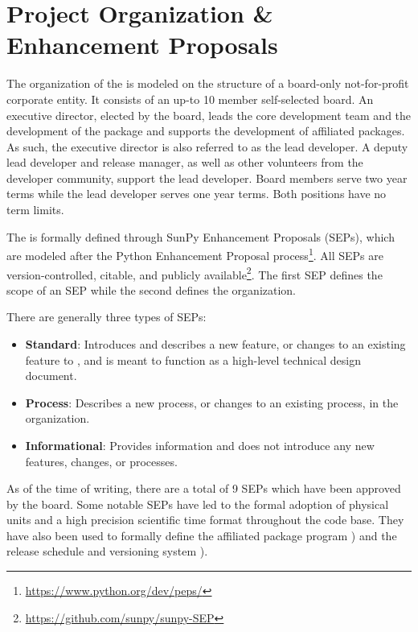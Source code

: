 \section{Project Organization \& Enhancement Proposals}
\label{sec:proj_org}

The organization of the \sunpyproj is modeled on the structure of a board-only not-for-profit corporate entity.
It consists of an up-to 10 member self-selected board.
An executive director, elected by the board, leads the core development team and the development of the \sunpypkg  package and supports the development of affiliated packages.
As such, the executive director is also referred to as the lead developer.
A deputy lead developer and release manager, as well as other volunteers from the developer community, support the lead developer.
Board members serve two year terms while the lead developer serves one year terms. Both positions have no term limits.

The \sunpyproj is formally defined through SunPy Enhancement Proposals (SEPs), which are modeled after the Python Enhancement Proposal process\footnote{\url{https://www.python.org/dev/peps/}}.
All SEPs are version-controlled, citable, and publicly available\footnote{\url{https://github.com/sunpy/sunpy-SEP}}.
The first SEP \citep[SEP-0001][]{sep-0001} defines the scope of an SEP \citep[similar to][]{ape-0001} while the second \citep[SEP-0002][]{sep-0002} defines the  \sunpyproj organization.

There are generally three types of SEPs:
\begin{itemize}
    \item \textbf{Standard}: Introduces and describes a new feature, or changes to an existing feature to \sunpypkg, and is meant to function as a high-level technical design document.
    \item \textbf{Process}: Describes a new process, or changes to an existing process, in the organization.
    \item \textbf{Informational}: Provides information and does not introduce any new features, changes, or processes.
\end{itemize}

As of the time of writing, there are a total of 9 SEPs which have been approved by the board.
Some notable SEPs have led to the formal adoption of physical units \citep[SEP-0003,][see \autoref{sec:units}]{sep-0003}  and a high precision scientific time format \citep[SEP-0008,][see \autoref{sec:units}]{sep-0008} throughout the code base.
They have also been used to formally define the affiliated package program \citep[SEP-0004,][see \autoref{sec:affil_package}]{sep-0004}) and the release schedule and versioning system \citep[SEP-0009,][see \autoref{sec:release}]{sep-0009}).
